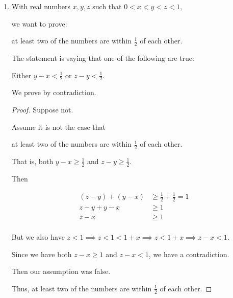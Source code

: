 \documentclass[12pt,letterpaper]{article}
\begin{document}
\begin{enumerate}
\begin{enumerate}
\begin{enumerate}
\begin{proof}
                Since we started with $a$ is odd, and arrived at $a + 1$ is even
                through only biconditional statements we have proved:

                $a$ is odd if and only if $a + 1$ is even.
              \end{proof}
          \end{enumerate}
        \setcounter{enumii}{10}
        \item
          With real numbers $x, y, z$ such that $0 < x < y < z < 1$,

          we want to prove:

          at least two of the numbers are within $\frac{1}{2}$ of each other.

          The statement is saying that one of the following are true:

          Either $y - x < \frac{1}{2}$ or $z - y < \frac{1}{2}$.

          We prove by contradiction.
          \begin{proof}
            Suppose not.

            Assume it is not the case that

            at least two of the numbers are within $\frac{1}{2}$ of each other.

            That is,
            both $y - x \geq \frac{1}{2}$ and $z - y \geq \frac{1}{2}$.

            Then

            \begin{align*}
              (z - y) + (y - x) &\geq \frac{1}{2} + \frac{1}{2} = 1 \\
              z - y + y - x &\geq 1 \\
              z - x &\geq 1 \\
            \end{align*}

            But we also have
            $z < 1 \implies z < 1 < 1 + x \implies z < 1 + x \implies z - x < 1$.

            Since we have both $z - x \geq 1$ and $z - x < 1$, we have a contradiction.

            Then our assumption was false.

            Thus,
            at least two of the numbers are within $\frac{1}{2}$ of each other.
          \end{proof}
      \end{enumerate}
  \end{enumerate}
\end{document}
